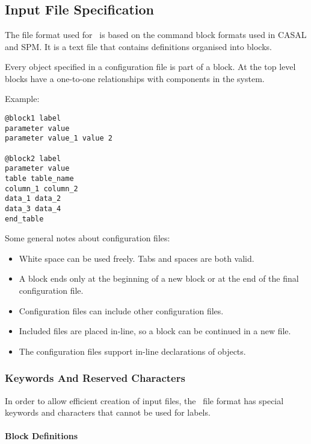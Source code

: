 
\section{\label{sec:examples}}

\subsection{Input File Specification}

The file format used for \CNAME\ is based on the command block formats used in CASAL and SPM. It is a text file that contains definitions organised into blocks.

Every object specified in a configuration file is part of a block. At the top level blocks have a one-to-one relationships with components in the system.

Example:

{\small{\begin{verbatim}
@block1 label
parameter value
parameter value_1 value 2

@block2 label
parameter value
table table_name
column_1 column_2
data_1 data_2
data_3 data_4
end_table
\end{verbatim}}}

Some general notes about configuration files:

\begin{itemize}
	\item White space can be used freely. Tabs and spaces are both valid.
	\item A block ends only at the beginning of a new block or at the end of the final configuration file.
	\item Configuration files can include other configuration files.
	\item Included files are placed in-line, so a block can be continued in a new file.
	\item The configuration files support in-line declarations of objects.
\end{itemize}

\subsubsection{Keywords And Reserved Characters}

In order to allow efficient creation of input files, the \CNAME\ file format has special keywords and characters that cannot be used for labels.

\paragraph*{\command Block Definitions}

